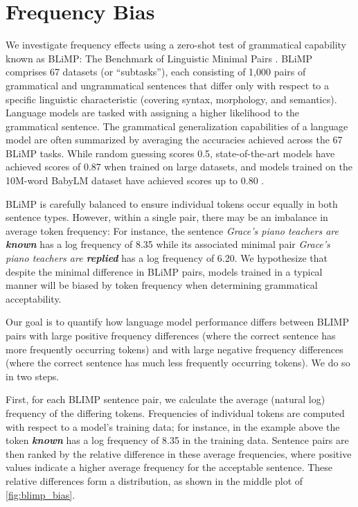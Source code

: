 \section{Frequency Bias}
\label{section:freq-bias}

We investigate frequency effects using a zero-shot test of grammatical capability known as BLiMP: The Benchmark of Linguistic Minimal Pairs \cite{warstadt2020blimp}. BLiMP comprises 67 datasets (or ``subtasks''), each consisting of 1,000 pairs of grammatical and ungrammatical sentences that differ only with respect to a specific linguistic characteristic (covering syntax, morphology, and semantics). Language models are tasked with assigning a higher likelihood to the grammatical sentence. The grammatical generalization capabilities of a language model are often summarized by averaging the accuracies achieved across the 67 BLiMP tasks. While random guessing scores 0.5, state-of-the-art models have achieved scores of 0.87 when trained on large datasets, and models trained on the 10M-word BabyLM dataset have achieved scores up to 0.80 \citep{warstadt2023findings}. 

BLiMP is carefully balanced to ensure individual tokens occur equally in both sentence types. However, within a single pair, there may be an imbalance in average token frequency: For instance, the sentence
\textit{Grace's piano teachers are \textbf{known}} has a log frequency of 8.35 while its associated minimal pair \textit{Grace's piano teachers are \textbf{replied}} has a log frequency of 6.20.  We hypothesize that despite the minimal difference in BLiMP pairs, models trained in a typical manner will be biased by token frequency when determining grammatical acceptability.

Our goal is to quantify how language model performance differs between BLIMP pairs with large positive frequency differences (where the correct sentence has more frequently occurring tokens) and with large negative frequency differences (where the correct sentence has much less frequently occurring tokens). We do so in two steps.

First, for each BLIMP sentence pair, we calculate the average (natural log) frequency of the differing tokens. Frequencies of individual tokens are computed with respect to a model's training data; for instance, in the example above the token \textit{\textbf{known}} has a log frequency of 8.35 in the training data. Sentence pairs are then ranked by the relative difference in these average frequencies, where positive values indicate a higher average frequency for the acceptable sentence. These relative differences form a distribution, as shown in the middle plot of \cref{fig:blimp_bias}. 

